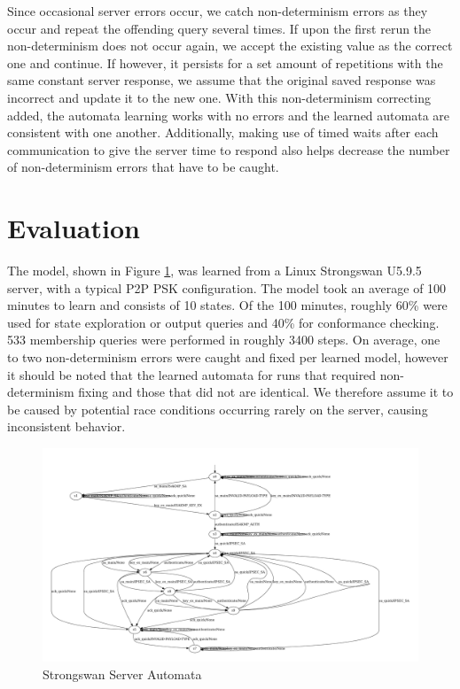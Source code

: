 \documentclass[runningheads]{llncs}
\begin{document}
Since occasional server errors occur, we catch non-determinism errors as they occur and repeat the offending query several times. If upon the first rerun the non-determinism does not occur again, we accept the existing value as the correct one and continue. If however, it persists for a set amount of repetitions with the same constant server response, we assume that the original saved response was incorrect and update it to the new one. With this non-determinism correcting added, the automata learning works with no errors and the learned automata are consistent with one another. Additionally, making use of timed waits after each communication to give the server time to respond also helps decrease the number of non-determinism errors that have to be caught.

\section{Evaluation} \label{chap:5} %
The model, shown in Figure \ref{fig:learnedmodel}, was learned from a Linux Strongswan U5.9.5 server, with a typical P2P PSK configuration. The model took an average of 100 minutes to learn and consists of 10 states. Of the 100 minutes, roughly 60\% were used for state exploration or output queries and 40\% for conformance checking. 533 membership queries were performed in roughly 3400 steps. On average, one to two non-determinism errors were caught and fixed per learned model, however it should be noted that the learned automata for runs that required non-determinism fixing and those that did not are identical. We therefore assume it to be caused by potential race conditions occurring rarely on the server, causing inconsistent behavior. 


\begin{figure}[!h]
	\centering
	\includegraphics[width=1\linewidth]{LearnedModel}
	\caption[Learned Model]{Strongswan Server Automata}
	\label{fig:learnedmodel}
\end{figure}
\end{document}
